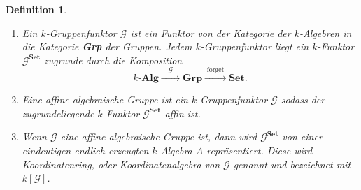 \documentclass[a4paper, 11pt]{scrartcl}
\theoremstyle{basicstyle}
\newtheorem{definition}{Definition}[section]
\begin{document}
    \begin{definition}
        \begin{enumerate}
            \item Ein \emph{\(k\)-Gruppenfunktor} \(\mathcal{G}\) ist ein Funktor von der Kategorie der \(k\)-Algebren in die Kategorie \textbf{Grp} der Gruppen.
                Jedem \(k\)-Gruppenfunktor liegt ein \(k\)-Funktor \(\mathcal{G}^{\textbf{Set}}\) zugrunde durch die Komposition
                \[k\textbf{-Alg} \xrightarrow{\quad \mathcal{G} \quad} \textbf{Grp} \xrightarrow{\;\text{forget}\;} \textbf{Set}.\]

            \item Eine \emph{affine algebraische Gruppe} ist ein \(k\)-Gruppenfunktor \(\mathcal{G}\) sodass der zugrundeliegende \(k\)-Funktor \(\mathcal{G}^{\textbf{Set}}\) affin ist.
            
            \item Wenn \(\mathcal{G}\) eine affine algebraische Gruppe ist, dann wird \(\mathcal{G}^{\textbf{Set}}\) von einer eindeutigen endlich erzeugten \(k\)-Algebra \(A\) repräsentiert.
                Diese wird \emph{Koordinatenring}, oder \emph{Koordinatenalgebra} von \(\mathcal{G}\) genannt und bezeichnet mit \(k[\mathcal{G}]\).

        \end{enumerate}
    \end{definition}
\end{document}
